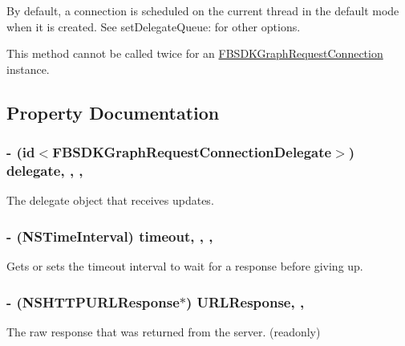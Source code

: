 By default, a connection is scheduled on the current thread in the default mode when it is created. See {\ttfamily set\-Delegate\-Queue\-:} for other options.

This method cannot be called twice for an {\ttfamily \hyperlink{interface_f_b_s_d_k_graph_request_connection}{F\-B\-S\-D\-K\-Graph\-Request\-Connection}} instance. 

\subsection{Property Documentation}
\hypertarget{interface_f_b_s_d_k_graph_request_connection_ac52bf8613194e0184e5ac33806dd6f7c}{
\subsubsection[{delegate}]{\setlength{\rightskip}{0pt plus 5cm}-\/ (id$<${\bf F\-B\-S\-D\-K\-Graph\-Request\-Connection\-Delegate}$>$) delegate\hspace{0.3cm}{\ttfamily [read]}, {\ttfamily [write]}, {\ttfamily [nonatomic]}, {\ttfamily [assign]}}}\label{interface_f_b_s_d_k_graph_request_connection_ac52bf8613194e0184e5ac33806dd6f7c}
The delegate object that receives updates. \hypertarget{interface_f_b_s_d_k_graph_request_connection_ad70caeba73b8f5c748d2f34b0bec74e0}{
\subsubsection[{timeout}]{\setlength{\rightskip}{0pt plus 5cm}-\/ (N\-S\-Time\-Interval) timeout\hspace{0.3cm}{\ttfamily [read]}, {\ttfamily [write]}, {\ttfamily [nonatomic]}, {\ttfamily [assign]}}}\label{interface_f_b_s_d_k_graph_request_connection_ad70caeba73b8f5c748d2f34b0bec74e0}
Gets or sets the timeout interval to wait for a response before giving up. \hypertarget{interface_f_b_s_d_k_graph_request_connection_a5179644ed8074f7e45e664c6ec5b17ab}{
\subsubsection[{U\-R\-L\-Response}]{\setlength{\rightskip}{0pt plus 5cm}-\/ (N\-S\-H\-T\-T\-P\-U\-R\-L\-Response$\ast$) U\-R\-L\-Response\hspace{0.3cm}{\ttfamily [read]}, {\ttfamily [nonatomic]}, {\ttfamily [retain]}}}\label{interface_f_b_s_d_k_graph_request_connection_a5179644ed8074f7e45e664c6ec5b17ab}
The raw response that was returned from the server. (readonly)

